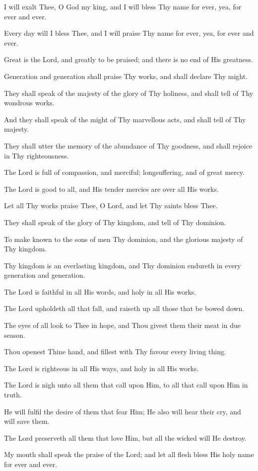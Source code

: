 I will exalt Thee, O God my king, and I will bless Thy name for ever, yea, for ever and ever.

Every day will I bless Thee, and I will praise Thy name for ever, yea, for ever and ever.

Great is the Lord, and greatly to be praised; and there is no end of His greatness.

Generation and generation shall praise Thy works, and shall declare Thy might.

They shall speak of the majesty of the glory of Thy holiness, and shall tell of Thy wondrous works.

And they shall speak of the might of Thy marvellous acts, and shall tell of Thy majesty.

They shall utter the memory of the abundance of Thy goodness, and shall rejoice in Thy righteousness.

The Lord is full of compassion, and merciful; longsuffering, and of great mercy.

The Lord is good to all, and His tender mercies are over all His works.

Let all Thy works praise Thee, O Lord, and let Thy saints bless Thee.

They shall speak of the glory of Thy kingdom, and tell of Thy dominion.

To make known to the sons of men Thy dominion, and the glorious majesty of Thy kingdom.

Thy kingdom is an everlasting kingdom, and Thy dominion endureth in every generation and generation.

The Lord is faithful in all His words, and holy in all His works.

The Lord upholdeth all that fall, and raiseth up all those that be bowed down.
 
The eyes of all look to Thee in hope, and Thou givest them their meat in due season.

Thou openest Thine hand, and fillest with Thy favour every living thing.

The Lord is righteous in all His ways, and holy in all His works.

The Lord is nigh unto all them that call upon Him, to all that call upon Him in truth.

He will fulfil the desire of them that fear Him; He also will hear their cry, and will save them.

The Lord preserveth all them that love Him, but all the wicked will He destroy.

My mouth shall speak the praise of the Lord; and let all flesh bless His holy name for ever and ever.
